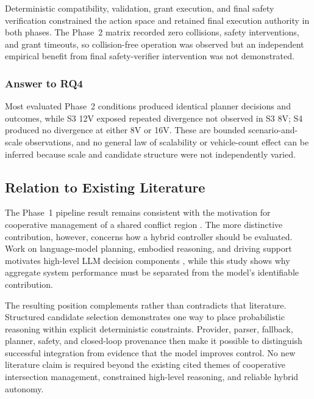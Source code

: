 \documentclass[letterpaper,10pt,conference]{ieeeconf}
\begin{document}
Deterministic compatibility, validation, grant execution, and final safety verification constrained the action space and retained final execution authority in both phases. The Phase~2 matrix recorded zero collisions, safety interventions, and grant timeouts, so collision-free operation was observed but an independent empirical benefit from final safety-verifier intervention was not demonstrated.



\subsubsection{Answer to RQ4}



Most evaluated Phase~2 conditions produced identical planner decisions and outcomes, while S3 12V exposed repeated divergence not observed in S3 8V; S4 produced no divergence at either 8V or 16V. These are bounded scenario-and-scale observations, and no general law of scalability or vehicle-count effect can be inferred because scale and candidate structure were not independently varied.



\subsection{Relation to Existing Literature}



The Phase~1 pipeline result remains consistent with the motivation for cooperative management of a shared conflict region \cite{Dresner2008,Safarov2022,Zhao2025}. The more distinctive contribution, however, concerns how a hybrid controller should be evaluated. Work on language-model planning, embodied reasoning, and driving support motivates high-level LLM decision components \cite{Huang2022,Driess2023,Wen2023,Jin2023,Cui2024}, while this study shows why aggregate system performance must be separated from the model's identifiable contribution.



The resulting position complements rather than contradicts that literature. Structured candidate selection demonstrates one way to place probabilistic reasoning within explicit deterministic constraints. Provider, parser, fallback, planner, safety, and closed-loop provenance then make it possible to distinguish successful integration from evidence that the model improves control. No new literature claim is required beyond the existing cited themes of cooperative intersection management, constrained high-level reasoning, and reliable hybrid autonomy.
\end{document}

